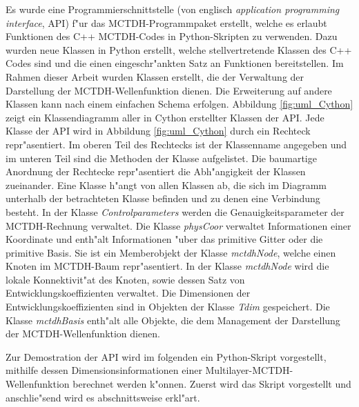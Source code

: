 Es wurde eine Programmierschnittstelle (von englisch \textit{application programming interface}, API) f"ur das MCTDH-Programmpaket erstellt,
welche es erlaubt Funktionen des C++ MCTDH-Codes in Python-Skripten zu verwenden.
Dazu wurden neue Klassen in Python erstellt, welche stellvertretende Klassen des C++ Codes sind 
und die einen eingeschr"ankten Satz an Funktionen bereitstellen.
Im Rahmen dieser Arbeit wurden Klassen erstellt, die der Verwaltung der Darstellung der MCTDH-Wellenfunktion dienen.
Die Erweiterung auf andere Klassen kann nach einem einfachen Schema erfolgen.
Abbildung \ref{fig:uml_Cython} zeigt ein Klassendiagramm aller in Cython erstellter Klassen der API.
Jede Klasse der API wird in Abbildung \ref{fig:uml_Cython} durch ein Rechteck repr"asentiert.
Im oberen Teil des Rechtecks ist der Klassenname angegeben und im unteren Teil sind die Methoden der Klasse aufgelistet.
Die baumartige Anordnung der Rechtecke repr"asentiert die Abh"angigkeit der Klassen zueinander. Eine Klasse h"angt von
allen Klassen ab, die sich im Diagramm unterhalb der betrachteten Klasse befinden und zu denen eine Verbindung besteht.
In der Klasse \textit{Controlparameters} werden die Genauigkeitsparameter der MCTDH-Rechnung verwaltet. 
Die Klasse \textit{physCoor} verwaltet Informationen einer Koordinate und enth"alt Informationen "uber das primitive Gitter oder
die primitive Basis. Sie ist ein Memberobjekt der Klasse \textit{mctdhNode}, welche einen Knoten im MCTDH-Baum 
repr"asentiert. In der Klasse \textit{mctdhNode} wird die lokale Konnektivit"at des Knoten, sowie dessen Satz von
Entwicklungskoeffizienten verwaltet. Die Dimensionen der Entwicklungskoeffizienten sind in Objekten der Klasse
\textit{Tdim} gespeichert. Die Klasse \textit{mctdhBasis} enth"alt alle Objekte, die dem Management der Darstellung der
MCTDH-Wellenfunktion dienen.

Zur Demostration der API wird im folgenden ein Python-Skript vorgestellt, mithilfe dessen Dimensionsinformationen
einer Multilayer-MCTDH-Wellenfunktion berechnet werden k"onnen. Zuerst wird das Skript vorgestellt und 
anschlie"send wird es abschnittsweise erkl"art.

